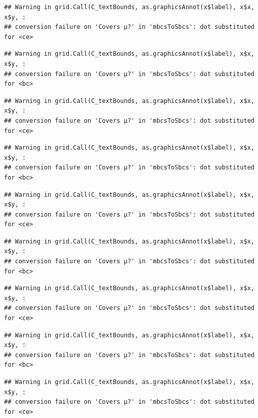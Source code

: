\documentclass[]{book}
\theoremstyle{definition}
\theoremstyle{definition}
\theoremstyle{definition}
\theoremstyle{remark}
\begin{document}
\begin{verbatim}
## Warning in grid.Call(C_textBounds, as.graphicsAnnot(x$label), x$x, x$y, :
## conversion failure on 'Covers μ?' in 'mbcsToSbcs': dot substituted for <ce>
\end{verbatim}

\begin{verbatim}
## Warning in grid.Call(C_textBounds, as.graphicsAnnot(x$label), x$x, x$y, :
## conversion failure on 'Covers μ?' in 'mbcsToSbcs': dot substituted for <bc>
\end{verbatim}

\begin{verbatim}
## Warning in grid.Call(C_textBounds, as.graphicsAnnot(x$label), x$x, x$y, :
## conversion failure on 'Covers μ?' in 'mbcsToSbcs': dot substituted for <ce>
\end{verbatim}

\begin{verbatim}
## Warning in grid.Call(C_textBounds, as.graphicsAnnot(x$label), x$x, x$y, :
## conversion failure on 'Covers μ?' in 'mbcsToSbcs': dot substituted for <bc>
\end{verbatim}

\begin{verbatim}
## Warning in grid.Call(C_textBounds, as.graphicsAnnot(x$label), x$x, x$y, :
## conversion failure on 'Covers μ?' in 'mbcsToSbcs': dot substituted for <ce>
\end{verbatim}

\begin{verbatim}
## Warning in grid.Call(C_textBounds, as.graphicsAnnot(x$label), x$x, x$y, :
## conversion failure on 'Covers μ?' in 'mbcsToSbcs': dot substituted for <bc>
\end{verbatim}

\begin{verbatim}
## Warning in grid.Call(C_textBounds, as.graphicsAnnot(x$label), x$x, x$y, :
## conversion failure on 'Covers μ?' in 'mbcsToSbcs': dot substituted for <ce>
\end{verbatim}

\begin{verbatim}
## Warning in grid.Call(C_textBounds, as.graphicsAnnot(x$label), x$x, x$y, :
## conversion failure on 'Covers μ?' in 'mbcsToSbcs': dot substituted for <bc>
\end{verbatim}

\begin{verbatim}
## Warning in grid.Call(C_textBounds, as.graphicsAnnot(x$label), x$x, x$y, :
## conversion failure on 'Covers μ?' in 'mbcsToSbcs': dot substituted for <ce>
\end{verbatim}
\end{document}
